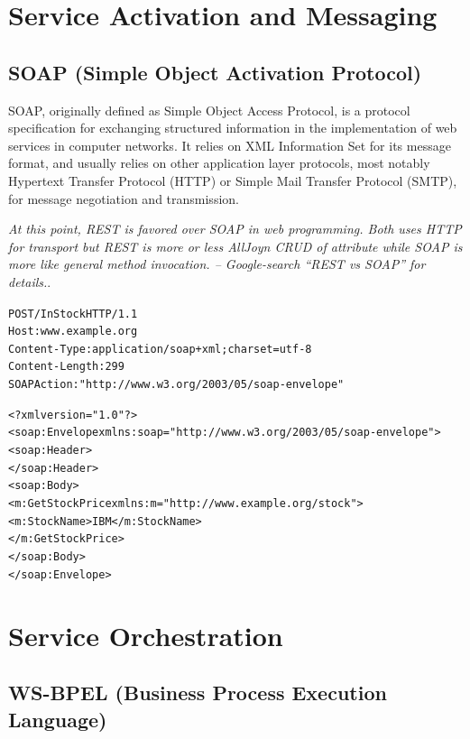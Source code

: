 \documentclass{note}
\begin{document}
\section{Service Activation and Messaging}
\subsection{SOAP (Simple Object Activation Protocol)}
SOAP, originally defined as Simple Object Access Protocol, is a protocol
specification for exchanging structured information in the implementation of
web services in computer networks. It relies on XML Information Set for its
message format, and usually relies on other application layer protocols, most
notably Hypertext Transfer Protocol (HTTP) or Simple Mail Transfer Protocol
(SMTP), for message negotiation and transmission. 

\textcolor{red2}{\em At this point, REST is favored over SOAP in web
  programming. Both uses HTTP for transport but REST is more or less AllJoyn
  CRUD of attribute while SOAP is more like general method invocation. --
  Google-search ``REST vs SOAP'' for details.\/}.  

\begin{alltt}
POST /InStock HTTP/1.1
Host: www.example.org
Content-Type: application/soap+xml; charset=utf-8
Content-Length: 299
SOAPAction: "http://www.w3.org/2003/05/soap-envelope"
 
<?xml version="1.0"?>
<soap:Envelope xmlns:soap="http://www.w3.org/2003/05/soap-envelope">
  <soap:Header>
  </soap:Header>
  <soap:Body>
    <m:GetStockPrice xmlns:m="http://www.example.org/stock">
      <m:StockName>IBM</m:StockName>
    </m:GetStockPrice>
  </soap:Body>
</soap:Envelope>
\end{alltt}

\section{Service Orchestration}
\subsection{WS-BPEL (Business Process Execution Language)}
\end{document}
